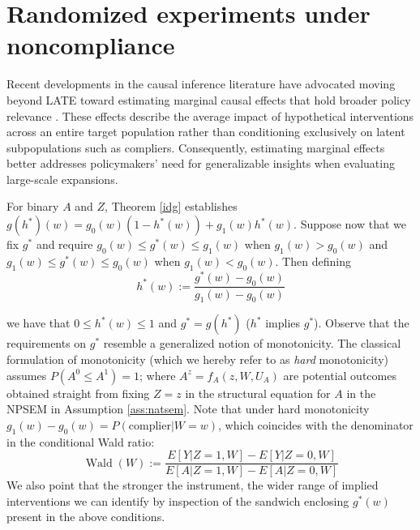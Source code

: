 \documentclass[12pt]{article}
\theoremstyle{thmstyleone}%
\theoremstyle{thmstyletwo}%
\theoremstyle{thmstylethree}%
\begin{document}
\section{Randomized experiments under noncompliance}\label{sec:late}

Recent developments in the causal inference literature have advocated moving beyond LATE toward estimating marginal causal effects that hold broader policy relevance \citep{carneiro,mogstad2018using}. These  {effects} describe the average impact of hypothetical interventions across an entire target population rather than conditioning exclusively on latent subpopulations such as compliers. Consequently, estimating marginal effects better addresses policymakers' need for generalizable insights when evaluating large-scale expansions. 

For binary $A$ and $Z$, Theorem \ref{idg} establishes $g(h^*)(w) = g_0(w)(1-h^*(w)) + g_1(w)h^*(w)$. Suppose now that we fix $g^*$ and require  $g_0(w) \leq g^*(w) \leq g_1(w) $ when $g_1(w) > g_0(w) $ and 
$g_1(w) \leq g^*(w) \leq g_0(w) $ when  $g_1(w)<   g_0(w) $. Then defining 
\begin{equation}\label{hthatimplies}
h^*(w) := \frac{g^*(w) - g_0(w)}{g_1(w) - g_0(w)}
\end{equation}

we have that $0 \leq h^*(w) \leq 1$ and $g^*=g(h^*)$ ($h^*$ implies $g^*$). Observe that the requirements on $g^*$ resemble a generalized notion of monotonicity. The classical formulation of monotonicity (which we hereby refer to as \textit{hard} monotonicity) assumes $P(A^{0} \leq A^{1})  =1$; where $A^z = f_A(z,W,U_A)$ are potential outcomes obtained straight from fixing $Z=z$ in the structural equation for $A$ in the NPSEM in Assumption \ref{ass:natsem}. Note that under hard monotonicity $g_1(w) - g_0(w) = P(\textrm{complier}|W=w)$, which coincides with the denominator in the conditional Wald ratio: \citep{angrist1996identification, ogburn2015doubly} $$ \operatorname{Wald}(W):=\frac{E[Y| Z=1,W]- E[Y|Z=0,W]}{E[A| Z=1,W]- E[A|Z=0,W]}$$ 
We also point that the stronger the instrument, the wider range of implied interventions we can identify by inspection of the sandwich enclosing $g^*(w)$ present in the above conditions. 
\end{document}
